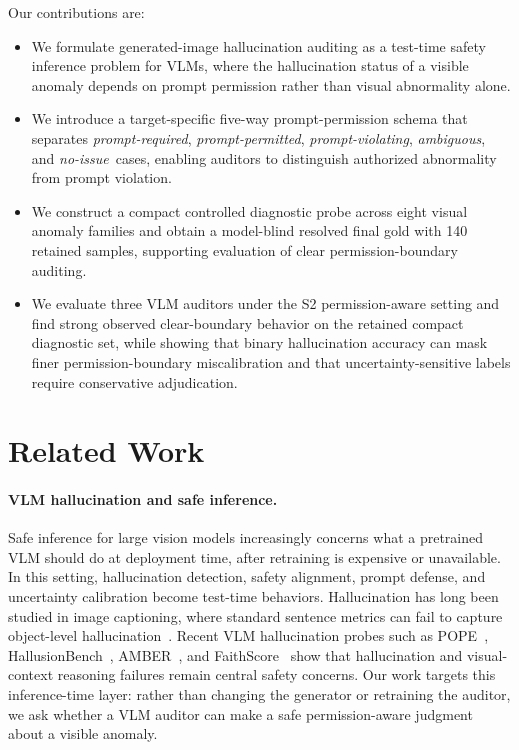 \documentclass[runningheads]{llncs}
\newcommand{\permrequired}{\emph{prompt-required}}
\newcommand{\permpermitted}{\emph{prompt-permitted}}
\newcommand{\permviolating}{\emph{prompt-violating}}
\newcommand{\permambiguous}{\emph{ambiguous}}
\newcommand{\permnoissue}{\emph{no-issue}}
\begin{document}
Our contributions are:
\begin{itemize}
    \item We formulate generated-image hallucination auditing as a test-time safety inference problem for VLMs, where the hallucination status of a visible anomaly depends on prompt permission rather than visual abnormality alone.
    \item We introduce a target-specific five-way prompt-permission schema that separates \permrequired, \permpermitted, \permviolating, \permambiguous, and \permnoissue\ cases, enabling auditors to distinguish authorized abnormality from prompt violation.
    \item We construct a compact controlled diagnostic probe across eight visual anomaly families and obtain a model-blind resolved final gold with 140 retained samples, supporting evaluation of clear permission-boundary auditing.
    \item We evaluate three VLM auditors under the S2 permission-aware setting and find strong observed clear-boundary behavior on the retained compact diagnostic set, while showing that binary hallucination accuracy can mask finer permission-boundary miscalibration and that uncertainty-sensitive labels require conservative adjudication.
\end{itemize}

\section{Related Work}

\paragraph{VLM hallucination and safe inference.}
Safe inference for large vision models increasingly concerns what a pretrained VLM should do at deployment time, after retraining is expensive or unavailable. In this setting, hallucination detection, safety alignment, prompt defense, and uncertainty calibration become test-time behaviors. Hallucination has long been studied in image captioning, where standard sentence metrics can fail to capture object-level hallucination~\cite{rohrbach2018object}. Recent VLM hallucination probes such as POPE~\cite{li2023pope}, HallusionBench~\cite{guan2024hallusionbench}, AMBER~\cite{wang2023amber}, and FaithScore~\cite{jing2023faithscore} show that hallucination and visual-context reasoning failures remain central safety concerns. Our work targets this inference-time layer: rather than changing the generator or retraining the auditor, we ask whether a VLM auditor can make a safe permission-aware judgment about a visible anomaly.
\end{document}
